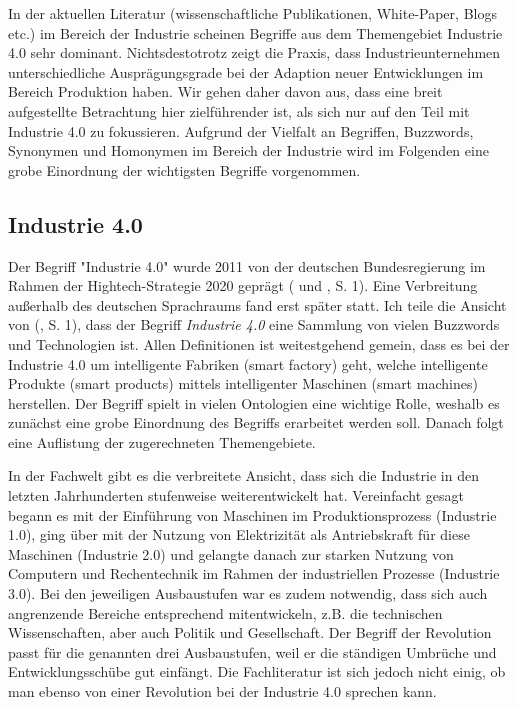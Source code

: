 \documentclass{article}
\begin{document}
In der aktuellen Literatur (wissenschaftliche Publikationen, White-Paper, Blogs etc.) im Bereich der Industrie scheinen Begriffe aus dem Themengebiet Industrie 4.0 sehr dominant.
Nichtsdestotrotz zeigt die Praxis, dass Industrieunternehmen unterschiedliche Ausprägungsgrade bei der Adaption neuer Entwicklungen im Bereich Produktion haben.
Wir gehen daher davon aus, dass eine breit aufgestellte Betrachtung hier zielführender ist, als sich nur auf den Teil mit Industrie 4.0 zu fokussieren.
Aufgrund der Vielfalt an Begriffen, Buzzwords, Synonymen und Homonymen im Bereich der Industrie wird im Folgenden eine grobe Einordnung der wichtigsten Begriffe vorgenommen.

\subsection{Industrie 4.0}

Der Begriff "Industrie 4.0" wurde 2011 von der deutschen Bundesregierung im Rahmen der Hightech-Strategie 2020 geprägt (\cite{lasi2014industrie} und \cite{trotta2018industry}, S. 1). Eine Verbreitung außerhalb des deutschen Sprachraums fand erst später statt. Ich teile die Ansicht von (\cite{ragavan2016engineering}, S. 1), dass der Begriff \textit{Industrie 4.0} eine Sammlung von vielen Buzzwords und Technologien ist. Allen Definitionen ist weitestgehend gemein, dass es bei der Industrie 4.0 um intelligente Fabriken (smart factory) geht, welche intelligente Produkte (smart products) mittels intelligenter Maschinen (smart machines) herstellen. Der Begriff spielt in vielen Ontologien eine wichtige Rolle, weshalb es zunächst eine grobe Einordnung des Begriffs erarbeitet werden soll. Danach folgt eine Auflistung der zugerechneten Themengebiete.

In der Fachwelt gibt es die verbreitete Ansicht, dass sich die Industrie in den letzten Jahrhunderten stufenweise weiterentwickelt hat. Vereinfacht gesagt begann es mit der Einführung von Maschinen im Produktionsprozess (Industrie 1.0), ging über mit der Nutzung von Elektrizität als Antriebskraft für diese Maschinen (Industrie 2.0) und gelangte danach zur starken Nutzung von Computern und Rechentechnik im Rahmen der industriellen Prozesse (Industrie 3.0). Bei den jeweiligen Ausbaustufen war es zudem notwendig, dass sich auch angrenzende Bereiche entsprechend mitentwickeln, z.B. die technischen Wissenschaften, aber auch Politik und Gesellschaft. Der Begriff der Revolution passt für die genannten drei Ausbaustufen, weil er die ständigen Umbrüche und Entwicklungsschübe gut einfängt. Die Fachliteratur ist sich jedoch nicht einig, ob man ebenso von einer Revolution bei der Industrie 4.0 sprechen kann.
\end{document}
